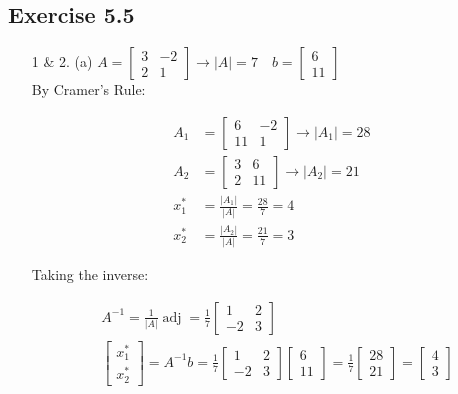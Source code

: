 \documentclass{./../../Latex/homework}
\begin{document}
\subsection*{Exercise 5.5} 

\begin{enumerate}
\item[1 \& 2.]  
(a) $A=\left[\begin{array}{cc}3 & -2 \\ 2 & 1\end{array}\right] \rightarrow|A|=7 \quad b=\left[\begin{array}{c}6 \\ 11\end{array}\right]$ \\

By Cramer's Rule:

$$
\begin{aligned}
A_{1} & =\left[\begin{array}{rr}
6 & -2 \\
11 & 1
\end{array}\right] \rightarrow\left|A_{1}\right|=28 \\
A_{2} & =\left[\begin{array}{ll}
3 & 6 \\
2 & 11
\end{array}\right] \rightarrow\left|A_{2}\right|=21 \\
x_{1}^{*} & =\frac{\left|A_{1}\right|}{|A|}=\frac{28}{7}=4 \\
x_{2}^{*} & =\frac{\left|A_{2}\right|}{|A|}=\frac{21}{7}=3
\end{aligned}
$$

Taking the inverse:

$$
\begin{aligned}
& A^{-1}=\frac{1}{|A|} \operatorname{adj}=\frac{1}{7}\left[\begin{array}{cc}1 & 2 \\-2 & 3\end{array}\right] \\
& \left[\begin{array}{l}x_{1}^{*} \\x_{2}^{*}\end{array}\right]=A^{-1} b=\frac{1}{7}\left[\begin{array}{rr}1 & 2 \\-2 & 3\end{array}\right]\left[\begin{array}{l}6 \\11\end{array}\right]=\frac{1}{7}\left[\begin{array}{l}28 \\21\end{array}\right]=\left[\begin{array}{l}4 \\3\end{array}\right] 
\end{aligned}
$$


\end{enumerate}
\end{document}
